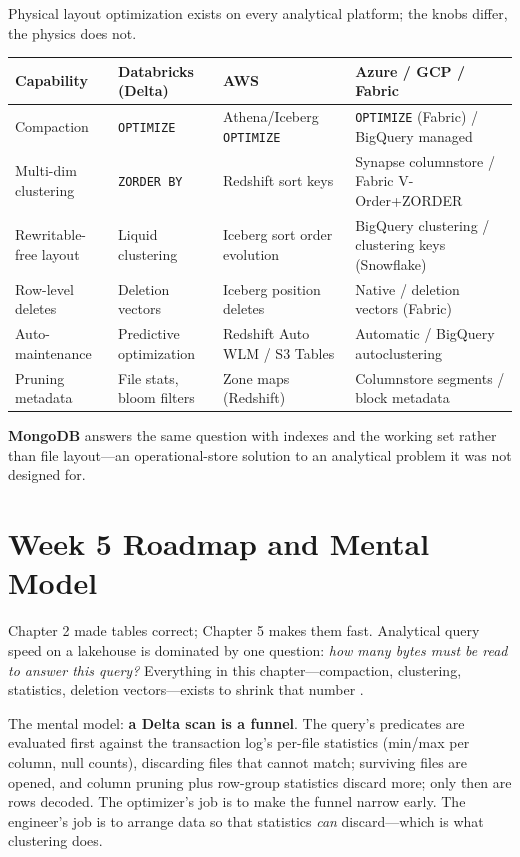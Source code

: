 \begin{crosscloud}
Physical layout optimization exists on every analytical platform; the knobs differ, the physics
does not.

\vspace{2mm}
{\footnotesize
\begin{tabular}{@{}p{3.0cm}p{3.4cm}p{3.2cm}p{3.2cm}@{}}
\toprule
\textbf{Capability} & \textbf{Databricks (Delta)} & \textbf{AWS} & \textbf{Azure / GCP / Fabric} \\
\midrule
Compaction & \texttt{OPTIMIZE} & Athena/Iceberg \texttt{OPTIMIZE} & \texttt{OPTIMIZE} (Fabric) / BigQuery managed \\
Multi-dim clustering & \texttt{ZORDER BY} & Redshift sort keys & Synapse columnstore / Fabric V-Order+ZORDER \\
Rewritable-free layout & Liquid clustering & Iceberg sort order evolution & BigQuery clustering / clustering keys (Snowflake) \\
Row-level deletes & Deletion vectors & Iceberg position deletes & Native / deletion vectors (Fabric) \\
Auto-maintenance & Predictive optimization & Redshift Auto WLM / S3 Tables & Automatic / BigQuery autoclustering \\
Pruning metadata & File stats, bloom filters & Zone maps (Redshift) & Columnstore segments / block metadata \\
\bottomrule
\end{tabular}}

\vspace{1mm}
\textbf{MongoDB} answers the same question with indexes and the working set rather than file
layout---an operational-store solution to an analytical problem it was not designed for.
\end{crosscloud}

\section{Week 5 Roadmap and Mental Model}
Chapter 2 made tables correct; Chapter 5 makes them fast. Analytical query speed on a lakehouse is dominated by one question: \emph{how many bytes must be read to answer this query?} Everything in this chapter---compaction, clustering, statistics, deletion vectors---exists to shrink that number \cite{databricksDeltaOptimize}.

The mental model: \textbf{a Delta scan is a funnel}. The query's predicates are evaluated first against the transaction log's per-file statistics (min/max per column, null counts), discarding files that cannot match; surviving files are opened, and column pruning plus row-group statistics discard more; only then are rows decoded. The optimizer's job is to make the funnel narrow early. The engineer's job is to arrange data so that statistics \emph{can} discard---which is what clustering does.

